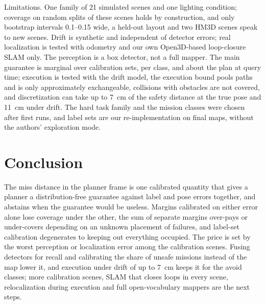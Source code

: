 \documentclass[conference]{IEEEtran}
\theoremstyle{definition}
\begin{document}
Limitations. One family of 21 simulated scenes and one lighting condition; coverage on random splits of these scenes
holds by construction, and only bootstrap intervals 0.1--0.15 wide, a held-out layout and two HM3D scenes speak to new
scenes. Drift is synthetic and independent of detector errors; real localization is tested with odometry and our own
Open3D-based loop-closure SLAM only. The perception is a box detector, not a full mapper. The main guarantee is marginal
over calibration sets, per class, and about the plan at query time; execution is tested with the drift model, the
execution bound pools paths and is only approximately exchangeable, collisions with obstacles are not covered, and
discretization can take up to 7~cm of the safety distance at the true pose and 11~cm under drift. The hard task family and the mission classes
were chosen after first runs, and label sets are our re-implementation on final maps, without the authors' exploration
mode.

\section{Conclusion}

The miss distance in the planner frame is one calibrated quantity that gives a planner a distribution-free guarantee
against label and pose errors together, and abstains when the guarantee would be useless. Margins calibrated on either
error alone lose coverage under the other, the sum of separate margins over-pays or under-covers depending on an unknown
placement of failures, and label-set calibration degenerates to keeping out everything occupied. The price is set by
the worst perception or localization error among the calibration scenes. Fusing detectors for recall and calibrating
the share of unsafe missions instead of the map lower it, and execution under drift of up to 7~cm keeps it for the avoid classes;
more calibration scenes, SLAM that closes loops in every scene, relocalization during execution and full
open-vocabulary mappers are the next steps.
\end{document}
